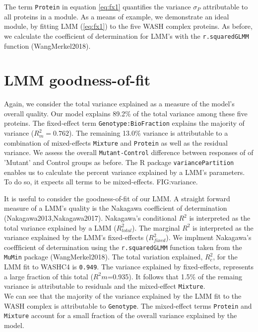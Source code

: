\documentclass[11pt]{elife}\usepackage[]{graphicx}\usepackage[]{color}
\begin{document}
The term \texttt{Protein} in equation \ref{eq:fx1} quantifies the variance
$\sigma_P$ attributable to all proteins in a module.  As a means of example, we
demonstrate an ideal module, by fitting LMM (\ref{eq:fx1}) to the five WASH
complex proteins.  As before, we calculate the coefficient of determination for
LMM's with the \texttt{r.squaredGLMM} function (WangMerkel2018).\\


\section{LMM goodness-of-fit}

Again, we consider the total variance explained as a measure of the model's
overall quality. Our model explains 89.2\% of the total variance among these
five proteins. The fixed-effect term \texttt{Genotype:BioFraction} explains the
majority of variance ($R^2_m=0.762$). The remaining 13.0\% variance is
attributable to a combination of mixed-effects \texttt{Mixture} and
\texttt{Protein} as well as the residual variance. We assess the overall
\texttt{Mutant-Control} difference between responses of of 'Mutant' and Control
groups as before. The R package \texttt{variancePartition} enables us to
calculate the percent variance explained by a LMM's parameters. To do so, it
expects all terms to be mixed-effects. FIG:variance.

It is useful to consider the goodness-of-fit of our LMM. A straight forward
measure of a LMM's quality is the Nakagawa coefficient of 
determination (Nakagawa2013,Nakagawa2017). Nakagawa's conditional $R^2$ is 
interpreted as the total variance explained by a LMM ($R^2_{total}$).
The marginal $R^2$ is interpreted as the variance explained by the LMM's 
fixed-effects ($R^2_{fixed}$). We implment Nakagawa's coeffficient of 
determination using the \texttt{r.squaredGLMM} function taken from the 
\texttt{MuMin} package (WangMerkel2018).
The total variation explained, $R^2_{c}$, for the LMM fit to WASHC4 is 
\texttt{0.949}. The variance explained by fixed-effects, represents a large
fraction of this total ($R^2{m}$=0.935). It follows that 1.5\% of the remaing
variance is attributable to residuals and the mixed-effect \texttt{Mixture}.\\

We can see that the majority of the variance explained by the LMM fit to the
WASH complex is attributable to \texttt{Genotype}. The mixed-effect terms
\texttt{Protein} and \texttt{Mixture} account for a small fraction of the 
overall variance explained by the model.
\end{document}
